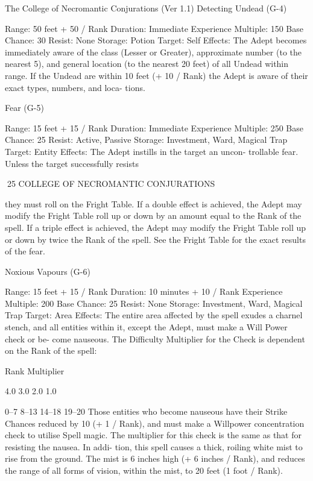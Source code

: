 \begin{Chapter}{The College of Necromantic Conjurations (Ver 1.1)}
Detecting Undead (G-4) 

Range: 50 feet + 50 / Rank 
Duration: Immediate 
Experience Multiple: 150 
Base Chance: 30%
Resist: None 
Storage: Potion 
Target: Self 
Effects: The Adept becomes immediately aware of 
the  class (Lesser  or  Greater),  approximate  number 
(to  the  nearest  5),  and  general  location  (to  the 
nearest  20  feet)  of  all  Undead  within  range.  If  the 
Undead are within 10 feet (+ 10 / Rank) the Adept 
is  aware  of  their  exact  types,  numbers,  and  loca-
tions. 

Fear (G-5) 

Range: 15 feet + 15 / Rank 
Duration: Immediate 
Experience Multiple: 250 
Base Chance: 25%
Resist: Active, Passive 
Storage: Investment, Ward, Magical Trap 
Target: Entity 
Effects:  The  Adept  instills  in  the  target  an  uncon-
trollable fear. Unless the target successfully resists 

25 COLLEGE OF NECROMANTIC CONJURATIONS 

they  must  roll  on  the  Fright  Table.  If  a  double 
effect  is  achieved,  the  Adept  may  modify  the 
Fright Table roll up or down by an amount equal to 
the Rank of the spell. If a triple effect is achieved, 
the  Adept  may  modify  the  Fright  Table  roll  up  or 
down by twice the Rank of the spell. See the Fright 
Table for the exact results of the fear. 

Noxious Vapours (G-6) 

Range: 15 feet + 15 / Rank 
Duration: 10 minutes + 10 / Rank 
Experience Multiple: 200 
Base Chance: 25%
Resist: None 
Storage: Investment, Ward, Magical Trap 
Target: Area 
Effects: The entire area affected by the spell exudes 
a  charnel  stench,  and  all  entities  within  it,  except 
the  Adept,  must  make  a  Will  Power  check  or  be-
come  nauseous.  The  Difficulty  Multiplier  for  the 
Check is dependent on the Rank of the spell: 

Rank  Multiplier 

4.0 
3.0 
2.0 
1.0 

0–7 
8–13 
14–18 
19–20 
Those  entities  who  become  nauseous  have  their 
Strike  Chances  reduced  by  10  (+  1  /  Rank),  and 
must  make  a  Willpower  concentration  check  to 
utilise Spell magic. The multiplier for this check is 
the  same  as  that  for  resisting  the  nausea.  In  addi-
tion, this spell causes a thick, roiling white mist to 
rise from the ground. The mist is 6 inches high (+ 6 
inches / Rank), and reduces the range of all forms 
of  vision,  within  the  mist,  to  20  feet  (1  foot  / 
Rank). 


\end{Chapter}
